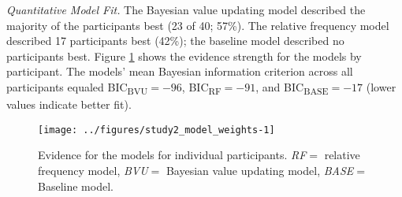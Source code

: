 \documentclass[a4paper, man, floatsintext]{apa6}
\begin{document}
\textit{Quantitative Model Fit.} The Bayesian value updating model
described the majority of the participants best (23 of 40; 57\%). The
relative frequency model described 17 participants best (42\%); the
baseline model described no participants best. Figure
\ref{fig:study2_model_weights} shows the evidence strength for the
models by participant. The models' mean Bayesian information criterion
across all participants equaled BIC\textsubscript{BVU}\(= -96\),
BIC\textsubscript{RF}\(= -91\), and BIC\textsubscript{BASE}\(= -17\)
(lower values indicate better fit).

\begin{figure}[htb]

{\centering \texttt{[image: ../figures/study2\_model\_weights-1]} 

}

\caption{Evidence for the models for individual participants. \textit{RF}$=$ relative frequency model, \textit{BVU}$=$ Bayesian value updating model, \textit{BASE}$=$ Baseline model.}\label{fig:study2_model_weights}
\end{figure}

\end{document}

